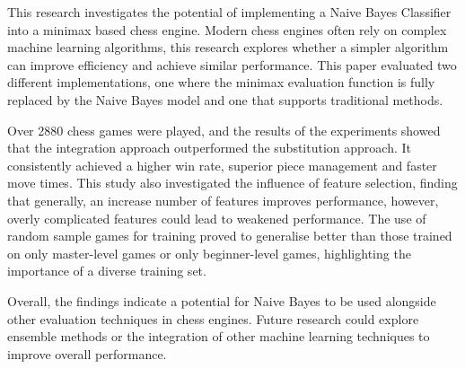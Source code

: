 This research investigates the potential of implementing a Naive Bayes Classifier into a minimax based chess engine. Modern chess engines often rely on complex machine learning algorithms, this research explores whether a simpler algorithm can improve efficiency and achieve similar performance. This paper evaluated two different implementations, one where the minimax evaluation function is fully replaced by the Naive Bayes model and one that supports traditional methods. 

Over 2880 chess games were played, and the results of the experiments showed that the integration approach outperformed the substitution approach. It consistently achieved a higher win rate, superior piece management and faster move times. This study also investigated the influence of feature selection, finding that generally, an increase number of features improves performance, however, overly complicated features could lead to weakened performance. The use of random sample games for training proved to generalise better than those trained on only master-level games or only beginner-level games, highlighting the importance of a diverse training set. 

Overall, the findings indicate a potential for Naive Bayes to be used alongside other evaluation techniques in chess engines. Future research could explore ensemble methods or the integration of other machine learning techniques to improve overall performance.